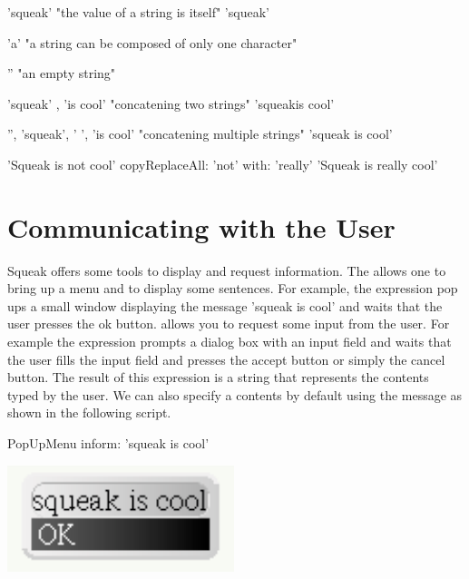 \begin{nalltt}
'squeak'                                                      "the value of a string is itself"
\pr 'squeak'

'a'							"a string can be composed of only one character"

''                                                        "an empty string"

'squeak' , 'is cool'                                        "concatening two strings"
\pr 'squeakis cool'

'', 'squeak', ' ', 'is cool'                              "concatening multiple strings"
\pr 'squeak is cool'

'Squeak is not cool' copyReplaceAll: 'not' with: 'really' 
\pr	'Squeak is really cool'
\end{nalltt}


\section{Communicating with the User}

Squeak offers some tools to display and request information. The  allows one to bring up a menu and to display some sentences. For example, the expression  pop ups a small window displaying the message 'squeak is cool' and waits that the user presses the ok button. 
 allows you to request some input from the user. For example the expression  prompts a dialog box with an input field and waits that the user fills the input field and presses the accept button or simply the cancel button. The result of this expression is a string that represents the contents typed by the user. We can also specify a contents by default using the message  as shown in the following script. 


\begin{minipage}[c]{0.5\linewidth}
\begin{nalltt}
PopUpMenu inform: 'squeak is cool'
\end{nalltt}
\end{minipage}
\begin{minipage}[c]{0.5\linewidth}
\includegraphics{inform}
\end{minipage}



